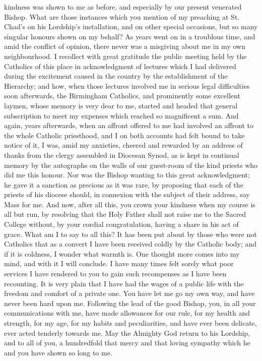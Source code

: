 kindness was shown to me as before, and especially by our present
venerated Bishop. What are those instances which you mention of my
preaching at St. Chad's on his Lordship's installation, and on other
special occasions, but so many singular honours shown on my behalf? As
years went on in a troublous time, and amid the conflict of opinion,
there never was a misgiving about me in my own neighbourhood. I
recollect with great gratitude the public meeting held by the
Catholics of this place in acknowledgment of lectures which I had
delivered during the excitement caused in the country by the
establishment of the Hierarchy; and how, when those lectures involved
me in serious legal difficulties soon afterwards, the Birmingham
Catholics, and prominently some excellent laymen, whose memory is very
dear to me, started and headed that general subscription to meet my
expenses which reached so magnificent a sum. And again, years
afterwards, when an affront offered to me had involved an affront to
the whole Catholic priesthood, and I on both accounts had felt bound
to take notice of it, I was, amid my anxieties, cheered and rewarded
by an address of thanks from the clergy assembled in Diocesan Synod,
as is kept in continual memory by the autographs on the walls of our
guest-room of the kind priests who did me this honour. Nor was the
Bishop wanting to this great acknowledgment; he gave it a sanction as
precious as it was rare, by proposing that each of the priests of his
diocese should, in connexion with the subject of their address, say
Mass for me. And now, after all this, you crown your kindness when my
course is all but run, by resolving that the Holy Father shall not
raise me to the Sacred College without, by your cordial
congratulation, having a share in his act of grace. What am I to say
to all this? It has been put about by those who were not Catholics
that as a convert I have been received coldly by the Catholic body;
and if it is coldness, I wonder what warmth is. One thought more comes
into my mind, and with it I will conclude. I have many times felt
sorely what poor services I have rendered to you to gain such
recompenses as I have been recounting. It is very plain that I have
had the wages of a public life with the freedom and comfort of a
private one. You have let me go my own way, and have never been hard
upon me. Following the lead of the good Bishop, you, in all your
communications with me, have made allowances for our rule, for my
health and strength, for my age, for my habits and peculiarities, and
have ever been delicate, ever acted tenderly towards me. May the
Almighty God return to his Lordship, and to all of you, a hundredfold
that mercy and that loving sympathy which he and you have shown so
long to me.

